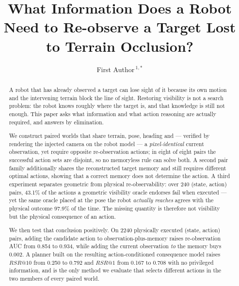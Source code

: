 \documentclass[utf8]{FrontiersinHarvard}
\def\firstAuthorLast{Author {et~al.}}
\def\Authors{First Author\,$^{1,*}$}
\begin{document}
\onecolumn
{}

\title[Terrain-Induced Target Re-observability]{What Information Does a Robot Need to
Re-observe a Target Lost to Terrain Occlusion?}

\author[\firstAuthorLast]{\Authors}
\address{}
\correspondance{}
\extraAuth{}

\maketitle

\begin{abstract}
A robot that has already observed a target can lose sight of it because its own motion
and the intervening terrain block the line of sight. Restoring visibility is not a
search problem: the robot knows roughly where the target is, and that knowledge is
still not enough. This paper asks what information and what action reasoning are
actually required, and answers by elimination.

We construct paired worlds that share terrain, pose, heading and --- verified by
rendering the injected camera on the robot model --- a \emph{pixel-identical} current
observation, yet require opposite re-observation actions; in eight of eight pairs the
successful action sets are disjoint, so no memoryless rule can solve both. A second
pair family additionally shares the reconstructed target memory and still requires
different optimal actions, showing that a correct memory does not determine the action.
A third experiment separates geometric from physical re-observability: over 240
(state, action) pairs, 43.1\% of the actions a geometric visibility oracle endorses
fail when executed --- yet the same oracle placed at the pose the robot
\emph{actually reaches} agrees with the physical outcome 97.9\% of the time. The
missing quantity is therefore not visibility but the physical consequence of an action.

We then test that conclusion positively. On 2240 physically executed (state, action)
pairs, adding the candidate action to observation-plus-memory raises re-observation
AUC from 0.854 to 0.934, while adding the current observation \emph{to} the memory buys
0.002. A planner built on the resulting action-conditioned consequence model raises
$RSR@10$ from 0.250 to 0.792 and $RSR@1$ from 0.167 to 0.708 with no privileged
information, and is the only method we evaluate that selects different actions in the
two members of every paired world.


\end{abstract}
\end{document}
